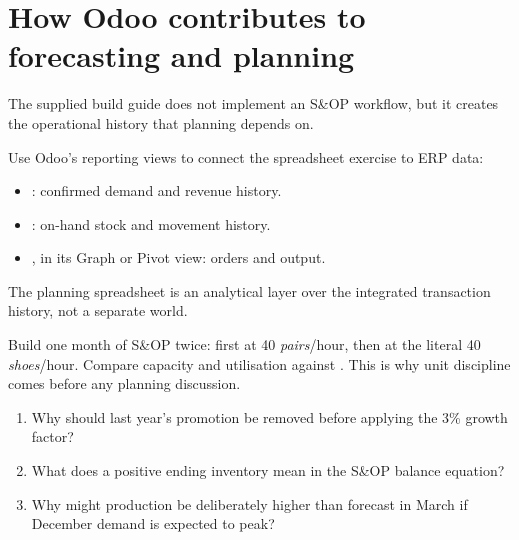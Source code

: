 \section{How Odoo contributes to forecasting and planning}

The supplied build guide does not implement an S\&OP workflow, but it creates the
operational history that planning depends on.

\begin{applicationbox}
Use Odoo's reporting views to connect the spreadsheet exercise to ERP data:
\begin{itemize}
  \item {}: confirmed demand and revenue history.
  \item {}: on-hand stock and movement history.
  \item {}, in its Graph or Pivot view: orders and output.
\end{itemize}
The planning spreadsheet is an analytical layer over the integrated transaction
history, not a separate world.
\end{applicationbox}

\begin{tryit}
Build one month of S\&OP twice: first at 40 \emph{pairs}/hour, then at the literal
40 \emph{shoes}/hour. Compare capacity and utilisation against
. This is why unit discipline comes before any
planning discussion.
\end{tryit}

\begin{quickcheck}
\begin{enumerate}
  \item Why should last year's promotion be removed before applying the 3\% growth factor?
  \item What does a positive ending inventory mean in the S\&OP balance equation?
  \item Why might production be deliberately higher than forecast in March if December demand is expected to peak?
\end{enumerate}
\end{quickcheck}
